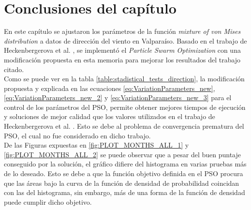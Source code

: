 \section{Conclusiones del capítulo}
En este capítulo se ajustaron los parámetros de la función \emph{mixture of von Mises distribution} a datos de dirección del viento en Valparaíso. Basado en el trabajo de Heckenbergerova et al. \cite{Heckenbergerova15}, se implementó el \emph{Particle Swarm Optimization} con una modificación propuesta en esta memoria para mejorar los resultados del trabajo citado.\\
Como se puede ver en la tabla \ref{table:stadistical_tests_direction}, la modificación propuesta y explicada en las ecuaciones \ref{eq:VariationParameters_new}, \ref{eq:VariationParameters_new_2} y \ref{eq:VariationParameters_new_3} para el control de los parámetros del PSO, permite obtener mejores tiempos de ejecución y soluciones de mejor calidad que los valores utilizados en el trabajo de Heckenbergerova et al. \cite{Heckenbergerova15}. Esto se debe al problema de convergencia prematura del PSO, el cual no fue considerado en dicho trabajo. \\
De las Figuras expuestas en \ref{fig:PLOT_MONTHS_ALL_1} y \ref{fig:PLOT_MONTHS_ALL_2} se puede observar que a pesar del buen puntaje conseguido por la solución, el gráfico difiere del histograma en varias pruebas más de lo deseado. Esto se debe a que la función objetivo definida en el PSO procura que las áreas bajo la curva de la función de densidad de probabilidad coincidan con las del histograma, sin embargo, más de una forma de la función de densidad puede cumplir dicho objetivo.